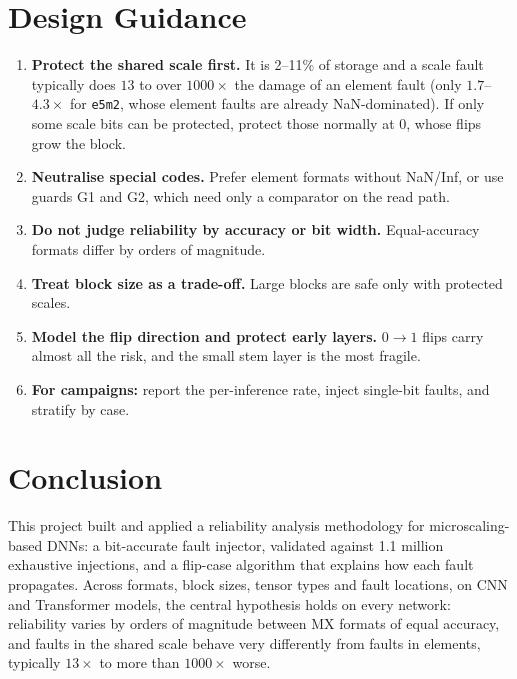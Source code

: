 \documentclass[12pt,a4paper]{article}
\newcommand{\fmt}[1]{\texttt{#1}}
\begin{document}
\section{Design Guidance}

\begin{enumerate}
    \item \textbf{Protect the shared scale first.} It is 2--11\% of storage and a scale fault
          typically does $13$ to over $1000\times$ the damage of an element fault (only
          $1.7$--$4.3\times$ for \fmt{e5m2}, whose element faults are already NaN-dominated). If only some scale bits can be
          protected, protect those normally at 0, whose flips grow the block.
    \item \textbf{Neutralise special codes.} Prefer element formats without NaN/Inf, or use guards
          G1 and G2, which need only a comparator on the read path.
    \item \textbf{Do not judge reliability by accuracy or bit width.} Equal-accuracy formats differ
          by orders of magnitude.
    \item \textbf{Treat block size as a trade-off.} Large blocks are safe only with protected scales.
    \item \textbf{Model the flip direction and protect early layers.} $0\to1$ flips carry
          almost all the risk, and the small stem layer is the most fragile.
    \item \textbf{For campaigns:} report the per-inference rate, inject single-bit faults, and
          stratify by case.
\end{enumerate}

\section{Conclusion}

This project built and applied a reliability analysis methodology for microscaling-based DNNs:
a bit-accurate fault injector, validated against 1.1 million exhaustive injections, and a
flip-case algorithm that explains how each fault propagates. Across formats, block sizes,
tensor types and fault locations, on CNN and Transformer models, the central hypothesis holds
on every network: reliability varies by orders of magnitude between MX formats of equal
accuracy, and faults in the shared scale behave very differently from faults in elements,
typically $13\times$ to more than $1000\times$ worse.
\end{document}
